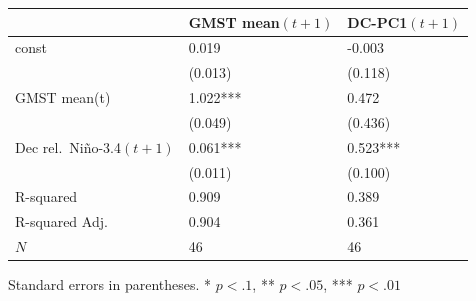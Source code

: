 \begin{tabular}{lll}
\hline
               & GMST mean$(t+1)$ & DC-PC1$(t+1)$  \\
\hline
const          & 0.019              & -0.003           \\
               & (0.013)            & (0.118)          \\
GMST mean(t)   & 1.022***           & 0.472            \\
               & (0.049)            & (0.436)          \\
Dec rel.\ Ni\~{n}o-3.4$(t+1)$  & 0.061***           & 0.523***         \\
               & (0.011)            & (0.100)          \\
R-squared      & 0.909              & 0.389            \\
R-squared Adj. & 0.904              & 0.361            \\
$N$          & 46                 & 46               \\
\hline
\end{tabular}

{Standard errors in parentheses. * $p<.1$, ** $p<.05$, *** $p<.01$}